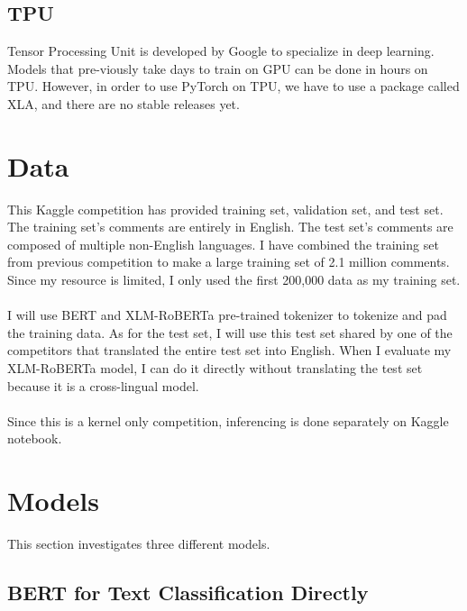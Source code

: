 \documentclass[11pt,a4paper]{article}
\begin{document}
\subsection{TPU}

Tensor Processing Unit is developed by Google to specialize in deep learning. Models that pre-viously take days to train on GPU can be done in hours on TPU. However, in order to use PyTorch on TPU, we have to use a package called XLA, and there are no stable releases yet.\\ 

\section{Data}

This Kaggle competition has provided training set, validation set, and test set. The training set’s comments are entirely in English. The test set’s comments are composed of multiple non-English languages. I have combined the training set from previous competition to make a large training set of 2.1 million comments. Since my resource is limited, I only used the first 200,000 data as my training set. \\
\\
I will use BERT and XLM-RoBERTa pre-trained tokenizer to tokenize and pad the training data. As for the test set, I will use this test set shared by one of the competitors \cite{test-en-df} that translated the entire test set into English. When I evaluate my XLM-RoBERTa model,  I can do it directly without translating the test set because it is a cross-lingual model.\\ 
\\
Since this is a kernel only competition, inferencing is done separately on Kaggle notebook.\\

\section{Models}

This section  investigates three different models.\\

\subsection{BERT for Text Classification Directly}
\end{document}
